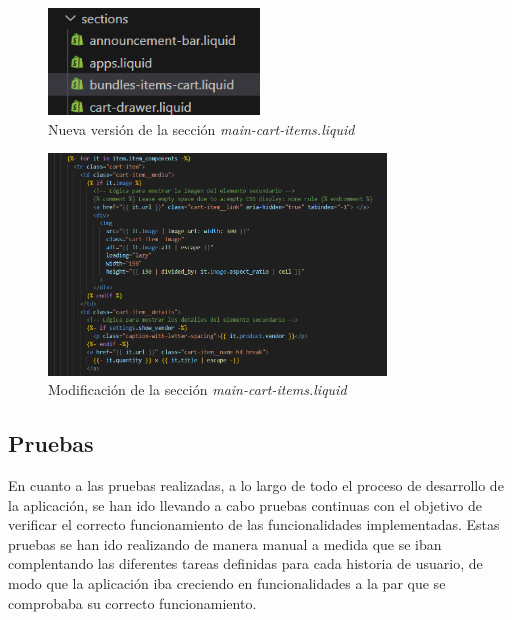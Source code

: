 \documentclass[12pt]{article}
\begin{document}
\begin{figure}[ht]
    \centering
    \includegraphics[width=0.5\textwidth]{imagenes-tema/creacionSeccionTema.png}
    \caption{\label{fig:seccionTema} Nueva versión de la sección \textit{main-cart-items.liquid}} 
    \vspace{\fill}
\end{figure}

\begin{figure}[ht]
    \centering
    \includegraphics[width=0.8\textwidth]{imagenes-tema/modificaciondetema.png}
    \caption{\label{fig:modificacionTema} Modificación de la sección \textit{main-cart-items.liquid}} 
    \vspace{\fill}
\end{figure}


\clearpage
\subsection{Pruebas}
En cuanto a las pruebas realizadas, a lo largo de todo el proceso de desarrollo de la aplicación, se han ido llevando a cabo pruebas continuas
con el objetivo de verificar el correcto funcionamiento de las funcionalidades implementadas. Estas pruebas se han ido realizando de manera manual 
a medida que se iban complentando las diferentes tareas definidas para cada historia de usuario, de modo que la aplicación iba creciendo en funcionalidades 
a la par que se comprobaba su correcto funcionamiento.
\end{document}
